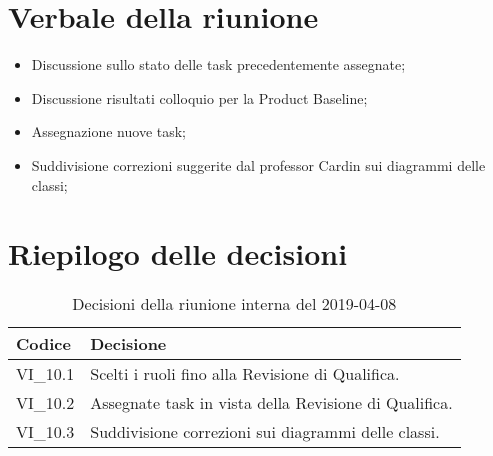 \section{Verbale della riunione}
\begin{itemize}
	\item Discussione sullo stato delle task precedentemente assegnate;
	\item Discussione risultati colloquio per la Product Baseline\glo;
	\item Assegnazione nuove task;
	\item Suddivisione correzioni suggerite dal professor Cardin sui diagrammi 
	delle classi;
	
\end{itemize}

\hspace{3cm}

\section{Riepilogo delle decisioni}

	
	\begin{longtable}{ >{\centering}p{} >{}p{}}
		\caption{Decisioni della riunione interna del 2019-04-08}\\	
		\rowcolorhead
		\textbf{\color{white}Codice} 
		& \centering\textbf{\color{white}Decisione} 
		\tabularnewline 
		\endfirsthead
		VI\_10.1 & Scelti i ruoli fino alla Revisione di Qualifica.
		\tabularnewline 
		VI\_10.2 & Assegnate task in vista della Revisione di Qualifica.
		\tabularnewline
		VI\_10.3 & Suddivisione correzioni sui diagrammi delle classi.\\
		
	\end{longtable}
	




